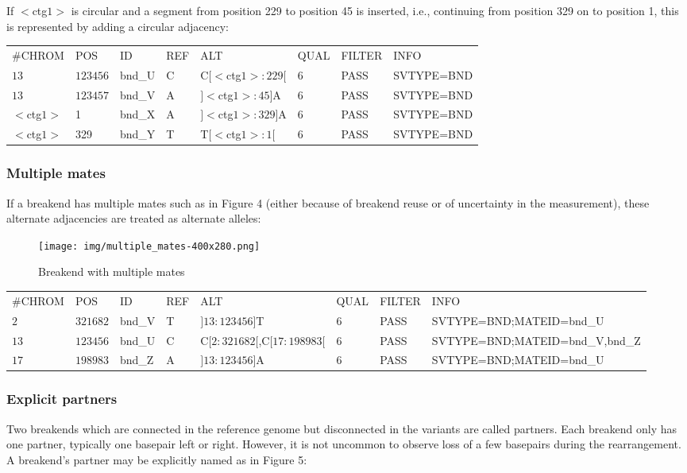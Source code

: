 \documentclass[8pt]{article}
\begin{document}
If $<$ctg$1>$ is circular and a segment from position 229 to position 45 is inserted, i.e., continuing from position 329 on to position 1, this is represented by adding a circular adjacency:

\vspace{0.3cm}
\small
\begin{tabular}{ l l l l l l l l }
\#CHROM & POS & ID & REF & ALT & QUAL & FILTER & INFO \\
$13$ & $123456$ & bnd\_U & C & C$[<$ctg$1>:229[$ & 6 & PASS & SVTYPE=BND \\
$13$ & $123457$ & bnd\_V & A & $]<$ctg$1>:45]$A & 6 & PASS & SVTYPE=BND \\
$<$ctg$1>$ & 1 & bnd\_X & A & $]<$ctg$1>:329]$A & 6 & PASS & SVTYPE=BND \\
$<$ctg$1>$ & 329 & bnd\_Y & T & T$[<$ctg$1>:1[$ & 6 & PASS & SVTYPE=BND \\
\end{tabular}
\normalsize

\subsubsection{Multiple mates}
If a breakend has multiple mates such as in Figure 4 (either because of breakend reuse or of uncertainty in the measurement), these alternate adjacencies are treated as alternate alleles:

\begin{figure}[h]
\centering
\texttt{[image: img/multiple\_mates-400x280.png]}
\caption{Breakend with multiple mates}
\end{figure}

\footnotesize
\begin{tabular}{ l l l l l l l l }
\#CHROM & POS & ID & REF & ALT & QUAL & FILTER & INFO \\
$2$ & $321682$ & bnd\_V & T & $]13:123456]$T & 6 & PASS & SVTYPE=BND;MATEID=bnd\_U \\
$13$ & $123456$ & bnd\_U & C & C$[2:321682[$,C$[17:198983[$ & 6 & PASS & SVTYPE=BND;MATEID=bnd\_V,bnd\_Z \\
$17$ & $198983$ & bnd\_Z & A & $]13:123456]$A & 6 & PASS & SVTYPE=BND;MATEID=bnd\_U \\
\end{tabular}
\normalsize

\subsubsection{Explicit partners}
Two breakends which are connected in the reference genome but disconnected in the variants are called partners.
Each breakend only has one partner, typically one basepair left or right.
However, it is not uncommon to observe loss of a few basepairs during the rearrangement.
A breakend's partner may be explicitly named as in Figure 5:
\end{document}
